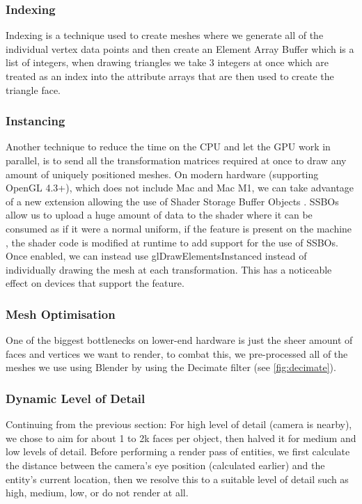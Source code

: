 \documentclass{article}
\begin{document}
\begin{multicols}{2}
                \subsubsection{Indexing}

                    Indexing is a technique used to create meshes where we generate all of the individual vertex data points and then create an Element Array Buffer which is a list of integers, when drawing triangles we take 3 integers at once which are treated as an index into the attribute arrays that are then used to create the triangle face.

                \subsubsection{Instancing}

                    Another technique to reduce the time on the CPU and let the GPU work in parallel, is to send all the transformation matrices required at once to draw any amount of uniquely positioned meshes. On modern hardware (supporting OpenGL 4.3+), which does not include Mac and Mac M1, we can take advantage of a new extension allowing the use of Shader Storage Buffer Objects \cite{ssbo}. SSBOs allow us to upload a huge amount of data to the shader where it can be consumed as if it were a normal uniform, if the feature is present on the machine \cite{extension-list}, the shader code is modified at runtime to add support for the use of SSBOs. Once enabled, we can instead use glDrawElementsInstanced instead of individually drawing the mesh at each transformation. This has a noticeable effect on devices that support the feature.

                \subsubsection{Mesh Optimisation}

                    One of the biggest bottlenecks on lower-end hardware is just the sheer amount of faces and vertices we want to render, to combat this, we pre-processed all of the meshes we use using Blender by using the Decimate filter (see \autoref{fig:decimate}).

                \subsubsection{Dynamic Level of Detail}

                    Continuing from the previous section: For high level of detail (camera is nearby), we chose to aim for about 1 to 2k faces per object, then halved it for medium and low levels of detail. Before performing a render pass of entities, we first calculate the distance between the camera’s eye position (calculated earlier) and the entity’s current location, then we resolve this to a suitable level of detail such as high, medium, low, or do not render at all.



\end{multicols}
\end{document}
